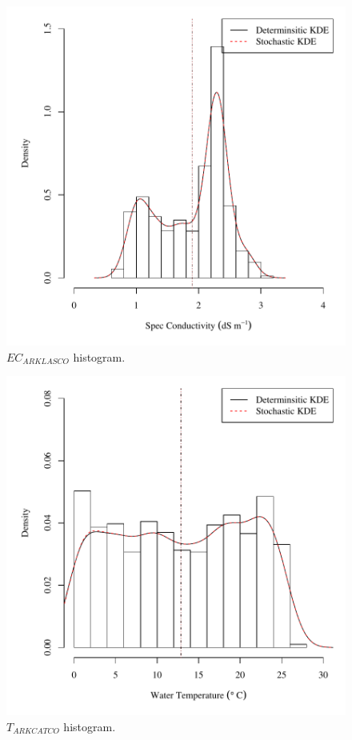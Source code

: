 \begin{center}
\begin{figure}[htbp]
	\includegraphics[width=6in]{"Figures/Results_USR/V density ecout"}
	\caption{$EC_{ARKLASCO}$ histogram.}
\end{figure}
\end{center}
\newpage

\begin{center}
\begin{figure}[htbp]
	\includegraphics[width=6in]{"Figures/Results_USR/V density tin"}
	\caption{$T_{ARKCATCO}$ histogram.}
\end{figure}
\end{center}
\newpage

